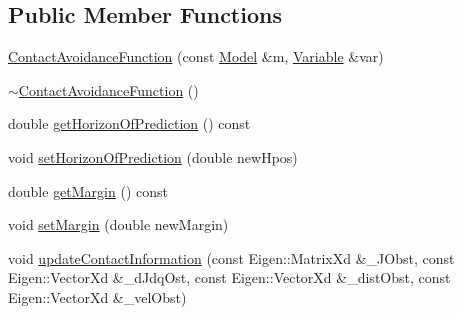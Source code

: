 \subsection*{Public Member Functions}
\begin{DoxyCompactItemize}
\item 
\hyperlink{classocra_1_1ContactAvoidanceFunction_a7db869c24ac20e1aff021f95ccf7dcd8}{Contact\+Avoidance\+Function} (const \hyperlink{classocra_1_1Model}{Model} \&m, \hyperlink{classocra_1_1Variable}{Variable} \&var)
\item 
\hyperlink{classocra_1_1ContactAvoidanceFunction_a5309c1fd586ed0292ee5eebfafacef9b}{$\sim$\+Contact\+Avoidance\+Function} ()
\item 
double \hyperlink{classocra_1_1ContactAvoidanceFunction_abe73646745514a2d112b7675462b8155}{get\+Horizon\+Of\+Prediction} () const 
\item 
void \hyperlink{classocra_1_1ContactAvoidanceFunction_abb04a99b523d82819d2b11bf9a7ea7f9}{set\+Horizon\+Of\+Prediction} (double new\+Hpos)
\item 
double \hyperlink{classocra_1_1ContactAvoidanceFunction_a40c3f2201f0eea519edede59fc1c8b69}{get\+Margin} () const 
\item 
void \hyperlink{classocra_1_1ContactAvoidanceFunction_a4ae90405d1464527310ce1d93df2e862}{set\+Margin} (double new\+Margin)
\item 
void \hyperlink{classocra_1_1ContactAvoidanceFunction_aee28a7fe69481db190d2e26b603659ea}{update\+Contact\+Information} (const Eigen\+::\+Matrix\+Xd \&\+\_\+\+J\+Obst, const Eigen\+::\+Vector\+Xd \&\+\_\+d\+Jdq\+Ost, const Eigen\+::\+Vector\+Xd \&\+\_\+dist\+Obst, const Eigen\+::\+Vector\+Xd \&\+\_\+vel\+Obst)
\end{DoxyCompactItemize}
